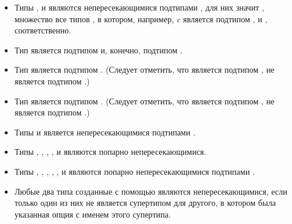 \begin{itemize}
\item
Типы ,  и
 являются непересекающимися подтипами ,
для них значит
 , множество все типов
, в котором, например, \emph{c} является подтипом ,
и , соответственно.
\end{itemize}


\begin{itemize}
\item
Тип  является подтипом  и, конечно, подтипом
. 

\item
Тип  является подтипом .
(Следует отметить, что  является подтипом ,
 не является подтипом .)
\end{itemize}

\begin{itemize}
\item
Тип  является подтипом .
(Следует отметить, что  является подтипом ,
 не является подтипом .)

\item
Типы  и  является непересекающимися подтипами .

\item
Типы , , , ,
 и  являются попарно непересекающимися.
\end{itemize}

\begin{itemize}
\item
Типы , ,
, , ,
 и
 являются попарно непересекающимися подтипами .
\end{itemize}

\begin{itemize}
\item
Любые два типа созданные с помощью   являются непересекающимися,
если только один из них не является супертипом для другого, в котором была
указанная опция  с именем этого супертипа.
\end{itemize}

\fi
